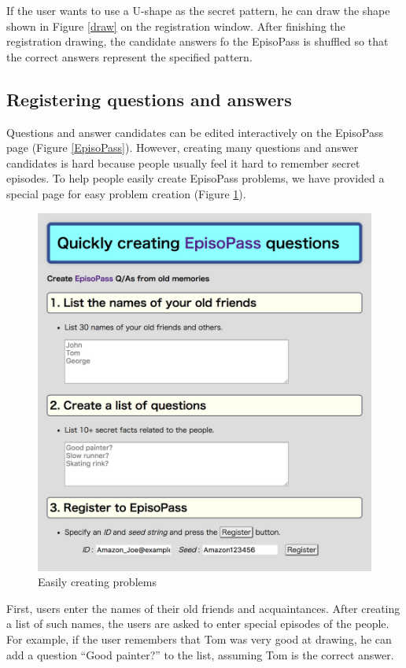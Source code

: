 \documentclass[sigconf]{acmart}
\begin{document}
If the user wants to use a U-shape as the secret pattern,
he can draw the shape shown in Figure \ref{draw}
on the registration window.
%
After finishing the registration drawing, the candidate answers fo the EpisoPass is
shuffled so that the correct answers represent the specified pattern.

\subsection{Registering questions and answers}

Questions and answer candidates can be edited interactively on the
EpisoPass page (Figure \ref{EpisoPass}).
However, creating many questions and answer candidates is hard because
people usually feel it hard to remember secret episodes.
%
To help people easily create EpisoPass problems,
we have provided a special page for easy problem creation
(Figure \ref{Easy}).

\begin{figure}[H]
  \includegraphics[width=12cm,bb=0 0 1332 1118]{figures/Easy.png}
  \caption{Easily creating problems}
  \label{Easy}
\end{figure}

First, users enter the names of their old friends and acquaintances.
After creating a list of such names,
the users are asked to enter special episodes of the people.
For example, if the user remembers that Tom was
very good at drawing, he can add a question
``Good painter?'' to the list, assuming Tom is the correct answer.
\end{document}
